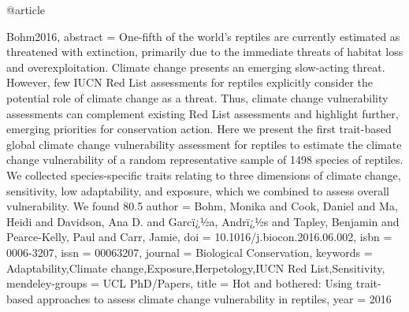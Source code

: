 {@article{Bohm2016,
abstract = {One-fifth of the world's reptiles are currently estimated as threatened with extinction, primarily due to the immediate threats of habitat loss and overexploitation. Climate change presents an emerging slow-acting threat. However, few IUCN Red List assessments for reptiles explicitly consider the potential role of climate change as a threat. Thus, climate change vulnerability assessments can complement existing Red List assessments and highlight further, emerging priorities for conservation action. Here we present the first trait-based global climate change vulnerability assessment for reptiles to estimate the climate change vulnerability of a random representative sample of 1498 species of reptiles. We collected species-specific traits relating to three dimensions of climate change, sensitivity, low adaptability, and exposure, which we combined to assess overall vulnerability. We found 80.5%
author = {Bohm, Monika and Cook, Daniel and Ma, Heidi and Davidson, Ana D. and Garc{\"{i}}¿½a, Andr{\"{i}}¿½s and Tapley, Benjamin and Pearce-Kelly, Paul and Carr, Jamie},
doi = {10.1016/j.biocon.2016.06.002},
isbn = {0006-3207},
issn = {00063207},
journal = {Biological Conservation},
keywords = {Adaptability,Climate change,Exposure,Herpetology,IUCN Red List,Sensitivity},
mendeley-groups = {UCL PhD/Papers},
title = {{Hot and bothered: Using trait-based approaches to assess climate change vulnerability in reptiles}},
year = {2016}
}


}}

